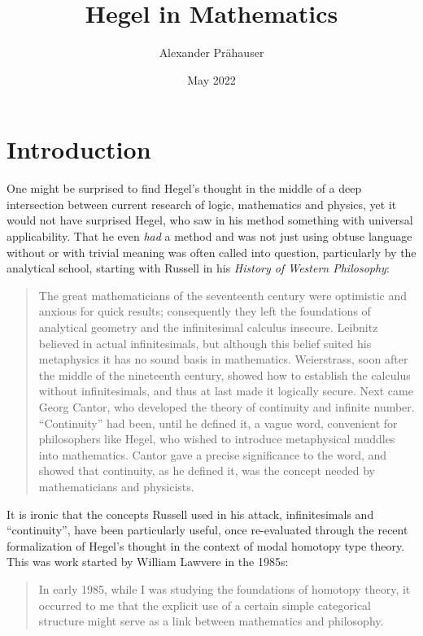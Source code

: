\documentclass{article}
\title{Hegel in Mathematics}
\author{Alexander Prähauser}
\date{May 2022}
\begin{document}
\maketitle

\tableofcontents

\section{Introduction}
One might be surprised to find Hegel's thought in the middle of a deep intersection between current research of logic, mathematics and physics, yet it would not have surprised Hegel, who saw in his method something with universal applicability. That he even \emph{had} a method and was not just using obtuse language without or with trivial meaning was often called into question, particularly by the analytical school, starting with Russell in his \emph{History of Western Philosophy}\cite{Russ}:

\begin{quote}
    The great mathematicians of the seventeenth century were optimistic and anxious for quick results; consequently they left the foundations of analytical geometry and the infinitesimal calculus insecure. Leibnitz believed in actual infinitesimals, but although this belief suited his metaphysics it has no sound basis in mathematics. Weierstrass, soon after the middle of the nineteenth century, showed how to establish the calculus without infinitesimals, and thus at last made it logically secure. Next came Georg Cantor, who developed the theory of continuity and infinite number. ``Continuity'' had been, until he defined it, a vague word, convenient for philosophers like Hegel, who wished to introduce metaphysical muddles into mathematics. Cantor gave a precise significance to the word, and showed that continuity, as he defined it, was the concept needed by mathematicians and physicists.
\end{quote}

It is ironic that the concepts Russell used in his attack, infinitesimals and ``continuity'', have been particularly useful, once re-evaluated through the recent formalization of Hegel's thought in the context of modal homotopy type theory. This was work started by William Lawvere in the 1985s\cite{Law96}:

\begin{quote}
    In early 1985, while I was studying the foundations of homotopy theory, it occurred to me that the explicit use of a certain simple categorical structure might serve as a link between mathematics and philosophy.
\end{quote}
\end{document}

